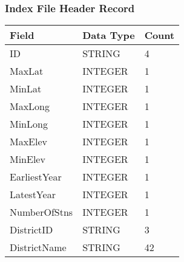 \documentclass[12pt]{article}
\begin{document}
\subsubsection{Index File Header Record}
\begin{center}
\begin{tabular}{l|l|l}
Field & Data Type & Count \\
\hline
ID & STRING & 4 \\
MaxLat & INTEGER & 1 \\
MinLat & INTEGER & 1 \\
MaxLong & INTEGER & 1 \\
MinLong & INTEGER & 1 \\
MaxElev & INTEGER & 1 \\
MinElev & INTEGER & 1 \\
EarliestYear & INTEGER & 1 \\
LatestYear & INTEGER & 1 \\
NumberOfStns & INTEGER & 1 \\
DistrictID & STRING & 3 \\
DistrictName & STRING & 42
\end{tabular}
\end{center}
\end{document}
